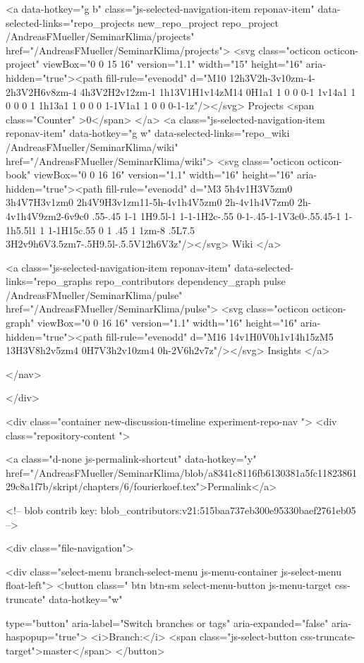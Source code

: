     <a data-hotkey="g b" class="js-selected-navigation-item reponav-item" data-selected-links="repo_projects new_repo_project repo_project /AndreasFMueller/SeminarKlima/projects" href="/AndreasFMueller/SeminarKlima/projects">
      <svg class="octicon octicon-project" viewBox="0 0 15 16" version="1.1" width="15" height="16" aria-hidden="true"><path fill-rule="evenodd" d="M10 12h3V2h-3v10zm-4-2h3V2H6v8zm-4 4h3V2H2v12zm-1 1h13V1H1v14zM14 0H1a1 1 0 0 0-1 1v14a1 1 0 0 0 1 1h13a1 1 0 0 0 1-1V1a1 1 0 0 0-1-1z"/></svg>
      Projects
      <span class="Counter" >0</span>
</a>
    <a class="js-selected-navigation-item reponav-item" data-hotkey="g w" data-selected-links="repo_wiki /AndreasFMueller/SeminarKlima/wiki" href="/AndreasFMueller/SeminarKlima/wiki">
      <svg class="octicon octicon-book" viewBox="0 0 16 16" version="1.1" width="16" height="16" aria-hidden="true"><path fill-rule="evenodd" d="M3 5h4v1H3V5zm0 3h4V7H3v1zm0 2h4V9H3v1zm11-5h-4v1h4V5zm0 2h-4v1h4V7zm0 2h-4v1h4V9zm2-6v9c0 .55-.45 1-1 1H9.5l-1 1-1-1H2c-.55 0-1-.45-1-1V3c0-.55.45-1 1-1h5.5l1 1 1-1H15c.55 0 1 .45 1 1zm-8 .5L7.5 3H2v9h6V3.5zm7-.5H9.5l-.5.5V12h6V3z"/></svg>
      Wiki
</a>

  <a class="js-selected-navigation-item reponav-item" data-selected-links="repo_graphs repo_contributors dependency_graph pulse /AndreasFMueller/SeminarKlima/pulse" href="/AndreasFMueller/SeminarKlima/pulse">
    <svg class="octicon octicon-graph" viewBox="0 0 16 16" version="1.1" width="16" height="16" aria-hidden="true"><path fill-rule="evenodd" d="M16 14v1H0V0h1v14h15zM5 13H3V8h2v5zm4 0H7V3h2v10zm4 0h-2V6h2v7z"/></svg>
    Insights
</a>

</nav>


  </div>

<div class="container new-discussion-timeline experiment-repo-nav  ">
  <div class="repository-content ">

    
  <a class="d-none js-permalink-shortcut" data-hotkey="y" href="/AndreasFMueller/SeminarKlima/blob/a8341c8116fb6130381a5fc1182386129c8a1f7b/skript/chapters/6/fourierkoef.tex">Permalink</a>

  <!-- blob contrib key: blob_contributors:v21:515baa737eb300e95330baef2761eb05 -->

  <div class="file-navigation">
    
<div class="select-menu branch-select-menu js-menu-container js-select-menu float-left">
  <button class=" btn btn-sm select-menu-button js-menu-target css-truncate" data-hotkey="w"
    
    type="button" aria-label="Switch branches or tags" aria-expanded="false" aria-haspopup="true">
      <i>Branch:</i>
      <span class="js-select-button css-truncate-target">master</span>
  </button>

